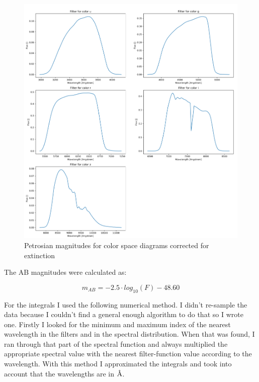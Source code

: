 \documentclass[a4paper,12pt]{article}
\newcommand{\angstrom}{\textup{\AA}}
\begin{document}
\begin{figure}[H]
	\centering
	\includegraphics[width=.66\textwidth]{./filters.png}
	\caption{ Petrosian magnitudes for color space diagrams corrected for extinction }
\end{figure}

\par The AB magnitudes were calculated as:

\begin{equation}
	m_{AB} = -2.5\cdot log_{10}(F) - 48.60
\end{equation}

\par For the integrals I used the following numerical method.
I didn't re-sample the data because I couldn't find a general enough
algorithm to do that so I wrote one. Firstly I looked for the 
minimum and maximum index of the nearest wavelength in the filters 
and in the spectral distribution. When that was found, I ran through
that part of the spectral function and always multiplied the 
appropriate spectral value with the nearest filter-function value
according to the wavelength. With this method I approximated the 
integrals and took into account that the wavelengths are in $\angstrom$.
\end{document}
